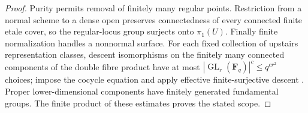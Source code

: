 \begin{proof}
Purity permits removal of finitely many regular points. Restriction
from a normal scheme to a dense open preserves connectedness of every
connected finite etale cover, so the regular-locus group surjects
onto $\pi_1(U)$. Finally finite normalization handles a nonnormal
surface. For each fixed collection of upstairs representation classes,
descent isomorphisms on the finitely many connected components of the
double fibre product have at most
$|\operatorname{GL}_r(\mathbf F_q)|^c\le q^{cr^2}$ choices; impose the
cocycle equation and apply effective finite-surjective descent
\citep[Expose IX, Theorem 4.7]{C_SGA1}. Proper lower-dimensional
components have finitely generated fundamental groups. The finite
product of these estimates proves the stated scope.
\end{proof}
